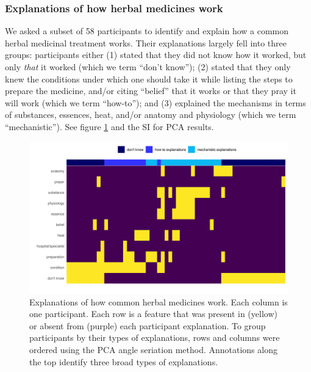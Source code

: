 \documentclass[
  11pt,
]{article}
\begin{document}
\hypertarget{explanations-of-how-herbal-medicines-work}{%
\subsubsection{Explanations of how herbal medicines work}\label{explanations-of-how-herbal-medicines-work}}

We asked a subset of 58 participants to identify and explain how a common herbal medicinal treatment works. Their explanations largely fell into three groups: participants either (1) stated that they did not know how it worked, but only \emph{that} it worked (which we term ``don't know''); (2) stated that they only knew the conditions under which one should take it while listing the steps to prepare the medicine, and/or citing ``belief'' that it works or that they pray it will work (which we term ``how-to''); and (3) explained the mechanisms in terms of substances, essences, heat, and/or anatomy and physiology (which we term ``mechanistic''). See figure \ref{fig:fieldplotCausalExp} and the SI for PCA results.

\begin{landscape}

\begin{figure}[p]

{\centering \includegraphics[width=9in]{images/field_medicalExplanations} 

}

\caption{Explanations of how common herbal medicines work. Each column is one participant. Each row is a feature that was present in (yellow) or absent from (purple) each participant explanation. To group participants by their types of explanations, rows and columns were ordered using the PCA angle seriation method. Annotations along the top identify three broad types of explanations.}\label{fig:fieldplotCausalExp}
\end{figure}

\end{landscape}
\end{document}

